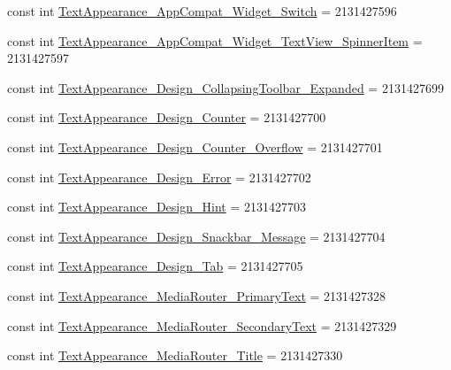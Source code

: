 \begin{DoxyCompactItemize}
const int \mbox{\hyperlink{class_f_w_p_s___app_1_1_droid_1_1_resource_1_1_style_ab2e87f25005b984e91464d5cf6000f56}{Text\+Appearance\+\_\+\+App\+Compat\+\_\+\+Widget\+\_\+\+Switch}} = 2131427596
\item 
const int \mbox{\hyperlink{class_f_w_p_s___app_1_1_droid_1_1_resource_1_1_style_af77b69c5aeed14fb19d0b3a17988a408}{Text\+Appearance\+\_\+\+App\+Compat\+\_\+\+Widget\+\_\+\+Text\+View\+\_\+\+Spinner\+Item}} = 2131427597
\item 
const int \mbox{\hyperlink{class_f_w_p_s___app_1_1_droid_1_1_resource_1_1_style_a96982fa63775179e2083083b6c8bc3b9}{Text\+Appearance\+\_\+\+Design\+\_\+\+Collapsing\+Toolbar\+\_\+\+Expanded}} = 2131427699
\item 
const int \mbox{\hyperlink{class_f_w_p_s___app_1_1_droid_1_1_resource_1_1_style_a488ef8cdd222ff93a4fd779e4e92124c}{Text\+Appearance\+\_\+\+Design\+\_\+\+Counter}} = 2131427700
\item 
const int \mbox{\hyperlink{class_f_w_p_s___app_1_1_droid_1_1_resource_1_1_style_aeb593e5fd8070ced1c6be70d8fcd5397}{Text\+Appearance\+\_\+\+Design\+\_\+\+Counter\+\_\+\+Overflow}} = 2131427701
\item 
const int \mbox{\hyperlink{class_f_w_p_s___app_1_1_droid_1_1_resource_1_1_style_a1956acd143c940a9e26579c8f8a3fac5}{Text\+Appearance\+\_\+\+Design\+\_\+\+Error}} = 2131427702
\item 
const int \mbox{\hyperlink{class_f_w_p_s___app_1_1_droid_1_1_resource_1_1_style_a5886470685737b1f22c0896a2499f70a}{Text\+Appearance\+\_\+\+Design\+\_\+\+Hint}} = 2131427703
\item 
const int \mbox{\hyperlink{class_f_w_p_s___app_1_1_droid_1_1_resource_1_1_style_aeadc31b6aab0b410c6a449109635d6c2}{Text\+Appearance\+\_\+\+Design\+\_\+\+Snackbar\+\_\+\+Message}} = 2131427704
\item 
const int \mbox{\hyperlink{class_f_w_p_s___app_1_1_droid_1_1_resource_1_1_style_a689617caaee3245690df6adda4916ae5}{Text\+Appearance\+\_\+\+Design\+\_\+\+Tab}} = 2131427705
\item 
const int \mbox{\hyperlink{class_f_w_p_s___app_1_1_droid_1_1_resource_1_1_style_afe56ce2001aeb05422c8985f54374ce8}{Text\+Appearance\+\_\+\+Media\+Router\+\_\+\+Primary\+Text}} = 2131427328
\item 
const int \mbox{\hyperlink{class_f_w_p_s___app_1_1_droid_1_1_resource_1_1_style_a6f7267d6678282b1bfbd65c8b8f72deb}{Text\+Appearance\+\_\+\+Media\+Router\+\_\+\+Secondary\+Text}} = 2131427329
\item 
const int \mbox{\hyperlink{class_f_w_p_s___app_1_1_droid_1_1_resource_1_1_style_af53e7a8a0c28ff4aebb91c46236a2e3f}{Text\+Appearance\+\_\+\+Media\+Router\+\_\+\+Title}} = 2131427330

\end{DoxyCompactItemize}
